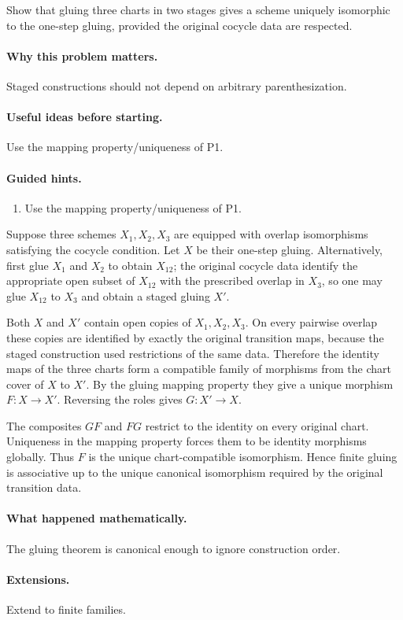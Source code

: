\begin{problem}\label{prob:vi20-p10}
Show that gluing three charts in two stages gives a scheme uniquely isomorphic to the one-step gluing, provided the original cocycle data are respected.
\end{problem}

\ifdefined\FullProblemDossiers
\paragraph{Why this problem matters.}
Staged constructions should not depend on arbitrary parenthesization.

\paragraph{Useful ideas before starting.}
Use the mapping property/uniqueness of P1.

\paragraph{Guided hints.}
\begin{enumerate}
\item Use the mapping property/uniqueness of P1.
\end{enumerate}

\begin{solution}
Suppose three schemes $X_1,X_2,X_3$ are equipped with overlap isomorphisms satisfying the cocycle condition.  Let $X$ be their one-step gluing.  Alternatively, first glue $X_1$ and $X_2$ to obtain $X_{12}$; the original cocycle data identify the appropriate open subset of $X_{12}$ with the prescribed overlap in $X_3$, so one may glue $X_{12}$ to $X_3$ and obtain a staged gluing $X'$.

Both $X$ and $X'$ contain open copies of $X_1,X_2,X_3$.  On every pairwise overlap these copies are identified by exactly the original transition maps, because the staged construction used restrictions of the same data.  Therefore the identity maps of the three charts form a compatible family of morphisms from the chart cover of $X$ to $X'$.  By the gluing mapping property they give a unique morphism $F:X\to X'$.  Reversing the roles gives $G:X'\to X$.

The composites $GF$ and $FG$ restrict to the identity on every original chart.  Uniqueness in the mapping property forces them to be identity morphisms globally.  Thus $F$ is the unique chart-compatible isomorphism.  Hence finite gluing is associative up to the unique canonical isomorphism required by the original transition data.
\end{solution}


\paragraph{What happened mathematically.}
The gluing theorem is canonical enough to ignore construction order.

\paragraph{Extensions.}
Extend to finite families.
\fi
